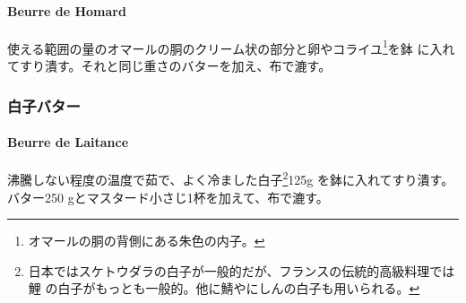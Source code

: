 \begin{recette}
\hypertarget{beurre-de-homard}{%
\paragraph{Beurre de Homard}\label{beurre-de-homard}}


使える範囲の量のオマールの胴のクリーム状の部分と卵やコライユ\footnote{オマールの胴の背側にある朱色の内子。}を鉢
に入れてすり潰す。それと同じ重さのバターを加え、布で漉す。

\maeaki

\hypertarget{ux767dux5b50ux30d0ux30bfux30fc}{%
\subsubsection{白子バター}\label{ux767dux5b50ux30d0ux30bfux30fc}}

\hypertarget{beurre-de-laitance}{%
\paragraph{Beurre de Laitance}\label{beurre-de-laitance}}


沸騰しない程度の温度で茹で、よく冷ました白子\footnote{日本ではスケトウダラの白子が一般的だが、フランスの伝統的高級料理では鯉
  の白子がもっとも一般的。他に鯖やにしんの白子も用いられる。}125g
を鉢に入れてすり潰す。 バター250
gとマスタード小さじ1杯を加えて、布で漉す。

\maeaki

\hypertarget{ux30e1ux30fcux30c8ux30ebux30c9ux30c6ux30eb25ux30d0ux30bfux30fc26}{%
}
\end{recette}
